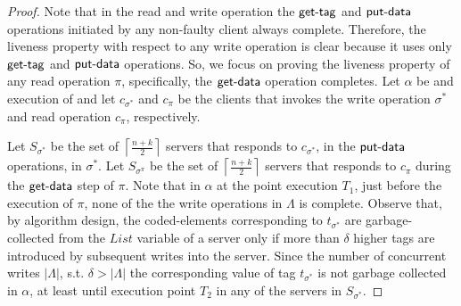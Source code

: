 				\begin{proof}
				Note that in the read and write operation the  $\act{get-tag}$ and $\act{put-data}$ operations initiated by any non-faulty client  always complete.
				Therefore, the liveness property with respect to any write operation is clear because it uses only  $\act{get-tag}$ and $\act{put-data}$ operations. So, we focus on proving the liveness property of any read operation $\pi$, 
				specifically,   the  $\act{get-data}$ operation completes. Let $\alpha $ be and execution of \treasmod{} and let 
				$c_{\sigma^*}$ and $c_{\pi}$ be the clients that invokes the write operation $\sigma^*$ and 
				read operation $c_{\pi}$, respectively.
				
				Let $S_{\sigma^{*}}$ be the set of 
				$\left\lceil \frac{n+k}{2} \right \rceil$ servers that responds to 
				$c_{\sigma^*}$, in the $\act{put-data}$ operations, in $\sigma^*$.
				 Let $S_{\sigma^{\pi}}$ be the set of $\left\lceil \frac{n+k}{2} \right \rceil$ servers that responds to  $c_{\pi}$ during the  $\act{get-data}$ step of $\pi$. Note that in $\alpha$ at the point execution $T_1$, just before the execution of  $\pi$, none of the the write operations in 
				 $\Lambda$ is complete. Observe that,  by algorithm design, the coded-elements corresponding to  $t_{\sigma^*}$ are garbage-collected from the $List$ variable of a server only if more than $\delta$ higher tags are introduced by subsequent writes into the server.  Since the number of concurrent writes  $|\Lambda|$, s.t.  $\delta > | \Lambda |$ the corresponding value of tag $t_{\sigma^*}$ is not garbage collected in $\alpha$, at least until execution point $T_2$  in  any of the servers in $S_{\sigma^*}$.
				 

\end{proof}
